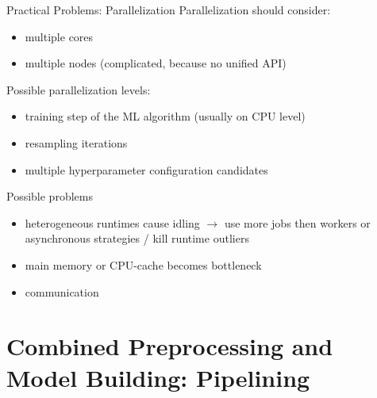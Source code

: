 \begin{frame}{Practical Problems: Parallelization}
  Parallelization should consider:
  \begin{itemize}
    \item multiple cores
    \item multiple nodes (complicated, because no unified API)
  \end{itemize}

  Possible parallelization levels:
  \begin{itemize}
    \item training step of the ML algorithm (usually on CPU level)
    \item resampling iterations
    \item multiple hyperparameter configuration candidates
  \end{itemize}

  Possible problems
  \begin{itemize}
    \item heterogeneous runtimes cause idling $\longrightarrow$ use more jobs then workers or asynchronous strategies / kill runtime outliers
    \item main memory or CPU-cache becomes bottleneck
    \item communication 
  \end{itemize}

\end{frame}


\section{Combined Preprocessing and Model Building: Pipelining}


